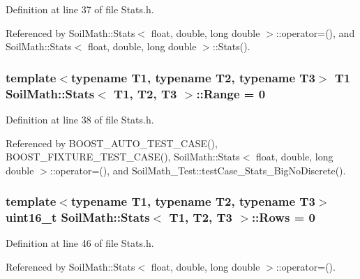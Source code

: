 Definition at line 37 of file Stats.\+h.



Referenced by Soil\+Math\+::\+Stats$<$ float, double, long double $>$\+::operator=(), and Soil\+Math\+::\+Stats$<$ float, double, long double $>$\+::\+Stats().

\hypertarget{class_soil_math_1_1_stats_a7154ac6c97dc2e83bdff7fef3cbdac5b}{}
\subsubsection[{Range}]{\setlength{\rightskip}{0pt plus 5cm}template$<$typename T1, typename T2, typename T3$>$ T1 {\bf Soil\+Math\+::\+Stats}$<$ T1, T2, T3 $>$\+::Range = 0}\label{class_soil_math_1_1_stats_a7154ac6c97dc2e83bdff7fef3cbdac5b}


Definition at line 38 of file Stats.\+h.



Referenced by B\+O\+O\+S\+T\+\_\+\+A\+U\+T\+O\+\_\+\+T\+E\+S\+T\+\_\+\+C\+A\+S\+E(), B\+O\+O\+S\+T\+\_\+\+F\+I\+X\+T\+U\+R\+E\+\_\+\+T\+E\+S\+T\+\_\+\+C\+A\+S\+E(), Soil\+Math\+::\+Stats$<$ float, double, long double $>$\+::operator=(), and Soil\+Math\+\_\+\+Test\+::test\+Case\+\_\+\+Stats\+\_\+\+Big\+No\+Discrete().

\hypertarget{class_soil_math_1_1_stats_a0e462c013f12f02e31e9ae03334151c3}{}
\subsubsection[{Rows}]{\setlength{\rightskip}{0pt plus 5cm}template$<$typename T1, typename T2, typename T3$>$ uint16\+\_\+t {\bf Soil\+Math\+::\+Stats}$<$ T1, T2, T3 $>$\+::Rows = 0}\label{class_soil_math_1_1_stats_a0e462c013f12f02e31e9ae03334151c3}


Definition at line 46 of file Stats.\+h.



Referenced by Soil\+Math\+::\+Stats$<$ float, double, long double $>$\+::operator=().

\hypertarget{class_soil_math_1_1_stats_a06f5e8404c2a0fa303dbb18a58d6deb5}{}
